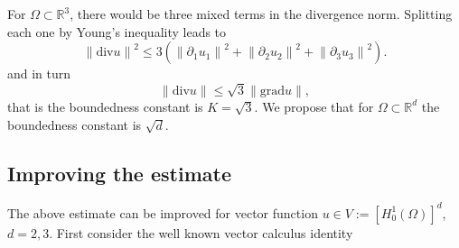\documentclass[a4paper,11pt]{article}
\newcommand{\norm}[1]{\ensuremath{\|#1\|}}
\newcommand{\Div}[1] {\ensuremath{\text{div}#1}}
\newcommand{\Grad}[1]{\ensuremath{\text{grad}#1}}
\begin{document}
For $\Omega\subset\mathbb{R}^3$, there would be three mixed terms in the 
divergence norm. Splitting each one by Young's inequality leads to 
\[
\norm{\Div{u}}^2 \leq 3\left(\norm{\partial_1u_1}^2 + \norm{\partial_2u_2}^2 + \norm{\partial_3u_3}^2\right).
\]
and in turn \[
\norm{\Div{u}} \leq \sqrt{3} \norm{\Grad{u}},
\]
that is the boundedness constant is $K=\sqrt{3}$. We propose that for $\Omega\subset\mathbb{R}^d$ the boundedness constant is $\sqrt{d}$.

\subsection*{Improving the estimate}

The above estimate can be improved for vector function $u\in
V:=\left[H^1_0(\Omega)\right]^d$,
$d=2, 3$. First consider the well known vector calculus identity
\end{document}
